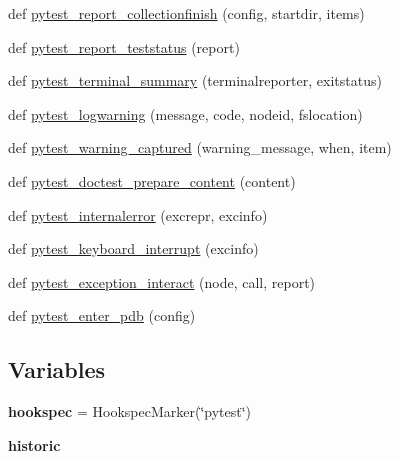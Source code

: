 \begin{DoxyCompactItemize}
def \hyperlink{namespace__pytest_1_1hookspec_a0d9ec0935d1a71bde956585a60771538}{pytest\+\_\+report\+\_\+collectionfinish} (config, startdir, items)
\item 
def \hyperlink{namespace__pytest_1_1hookspec_ac4827fd1c51f0ba66748b1c316eb6f46}{pytest\+\_\+report\+\_\+teststatus} (report)
\item 
def \hyperlink{namespace__pytest_1_1hookspec_aba4d803fe6e8f1673bde427fa1279f0f}{pytest\+\_\+terminal\+\_\+summary} (terminalreporter, exitstatus)
\item 
def \hyperlink{namespace__pytest_1_1hookspec_aa931d0e6af8083dfecc91f0ea7d3e13a}{pytest\+\_\+logwarning} (message, code, nodeid, fslocation)
\item 
def \hyperlink{namespace__pytest_1_1hookspec_a486765fb20868c692449f370cc841b93}{pytest\+\_\+warning\+\_\+captured} (warning\+\_\+message, when, item)
\item 
def \hyperlink{namespace__pytest_1_1hookspec_aa42483ab50d5e8bbd7be8bab17ece9a8}{pytest\+\_\+doctest\+\_\+prepare\+\_\+content} (content)
\item 
def \hyperlink{namespace__pytest_1_1hookspec_a61c213424357f9ba101b7d546f418111}{pytest\+\_\+internalerror} (excrepr, excinfo)
\item 
def \hyperlink{namespace__pytest_1_1hookspec_aed9a7463988eeeeb6c439fabf4cb3267}{pytest\+\_\+keyboard\+\_\+interrupt} (excinfo)
\item 
def \hyperlink{namespace__pytest_1_1hookspec_a9977923cb828cdb0483f3192304221d3}{pytest\+\_\+exception\+\_\+interact} (node, call, report)
\item 
def \hyperlink{namespace__pytest_1_1hookspec_a504e4cd5404c91bed16b35ca3f88d7fc}{pytest\+\_\+enter\+\_\+pdb} (config)
\end{DoxyCompactItemize}
\subsection*{Variables}
\begin{DoxyCompactItemize}
\item 
\mbox{\label{namespace__pytest_1_1hookspec_ac24a2a2c5a77df1a69b5c1c103e5b056}} 
{\bfseries hookspec} = Hookspec\+Marker(\char`\"{}pytest\char`\"{})
\item 
\mbox{\label{namespace__pytest_1_1hookspec_a95da55b1f697fd4d8033b9227afc1c4d}} 
{\bfseries historic}
\end{DoxyCompactItemize}


